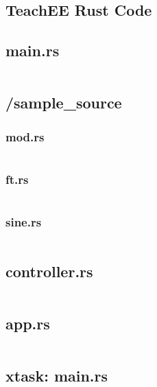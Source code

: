 \documentclass[letterpaper,11pt]{article}
\begin{document}
\begin{appendices}
    \section{TeachEE Rust Code} \label{appendix:software}

    \subsection*{main.rs}
    \inputminted[linenos,breaklines]{rust}{../../software/teachee-desktop/src/main.rs}

    \subsection*{/sample\_source}

    \subsubsection*{mod.rs} \label{appendix:software-mod}
    \inputminted[linenos,breaklines]{rust}{../../software/teachee-desktop/src/sample_source/mod.rs}

    \subsubsection*{ft.rs} \label{appendix:software-ft}
    \inputminted[linenos,breaklines]{rust}{../../software/teachee-desktop/src/sample_source/ft.rs}

    \subsubsection*{sine.rs} \label{appendix:software-sine}
    \inputminted[linenos,breaklines]{rust}{../../software/teachee-desktop/src/sample_source/sine.rs}

    \subsection*{controller.rs} \label{appendix:software-controller}
    \inputminted[linenos,breaklines]{rust}{../../software/teachee-desktop/src/controller.rs}

    \subsection*{app.rs} \label{appendix:software-app}
    \inputminted[linenos,breaklines]{rust}{../../software/teachee-desktop/src/app.rs}

    \subsection*{xtask: main.rs} \label{appendix:software-script}
    \inputminted[linenos,breaklines]{rust}{../../software/teachee-desktop/xtask/src/main.rs}

    \end{appendices}
\end{document}
